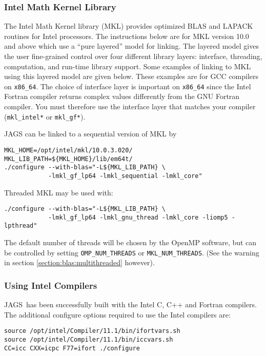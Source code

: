 \documentclass[11pt, a4paper, titlepage]{article}
\newcommand{\JAGS}{\textsf{JAGS}}
\begin{document}
\subsubsection{Intel Math Kernel Library}

The Intel Math Kernel library (MKL) provides optimized BLAS and LAPACK
routines for Intel processors. The instructions below are for MKL
version 10.0 and above which use a ``pure layered'' model for linking.
The layered model gives the user fine-grained control over four
different library layers: interface, threading, computation, and
run-time library support. Some examples of linking to MKL using this
layered model are given below. These examples are for GCC compilers on
\verb+x86_64+. The choice of interface layer is important on
\verb+x86_64+ since the Intel Fortran compiler returns complex values
differently from the GNU Fortran compiler. You must therefore use the
interface layer that matches your compiler (\verb+mkl_intel*+ or
\verb+mkl_gf*+).

JAGS can be linked to a sequential version of MKL by
\begin{verbatim}
MKL_HOME=/opt/intel/mkl/10.0.3.020/
MKL_LIB_PATH=${MKL_HOME}/lib/em64t/
./configure --with-blas="-L${MKL_LIB_PATH} \
            -lmkl_gf_lp64 -lmkl_sequential -lmkl_core"
\end{verbatim}

Threaded MKL may be used with:
\begin{verbatim}
./configure --with-blas="-L${MKL_LIB_PATH} \
            -lmkl_gf_lp64 -lmkl_gnu_thread -lmkl_core -liomp5 -lpthread"
\end{verbatim}
The default number of threads will be chosen by the OpenMP software,
but can be controlled by setting \verb+OMP_NUM_THREADS+ or
\verb+MKL_NUM_THREADS+. (See the warning in section
\ref{section:blas:multithreaded} however).

\subsubsection{Using Intel Compilers}

\JAGS\ has been successfully built with the Intel C, C++ and Fortran
compilers.  The additional configure options required to use the Intel
compilers are:
\begin{verbatim}
source /opt/intel/Compiler/11.1/bin/ifortvars.sh
source /opt/intel/Compiler/11.1/bin/iccvars.sh
CC=icc CXX=icpc F77=ifort ./configure 
\end{verbatim}
\end{document}
